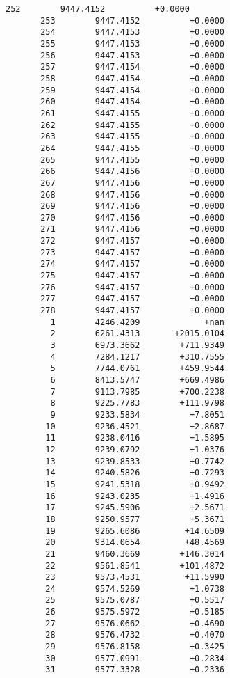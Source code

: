 \documentclass[11pt]{article}
\begin{document}
\begin{Verbatim}[commandchars=\\\{\}]
       252        9447.4152          +0.0000
       253        9447.4152          +0.0000
       254        9447.4153          +0.0000
       255        9447.4153          +0.0000
       256        9447.4153          +0.0000
       257        9447.4154          +0.0000
       258        9447.4154          +0.0000
       259        9447.4154          +0.0000
       260        9447.4154          +0.0000
       261        9447.4155          +0.0000
       262        9447.4155          +0.0000
       263        9447.4155          +0.0000
       264        9447.4155          +0.0000
       265        9447.4155          +0.0000
       266        9447.4156          +0.0000
       267        9447.4156          +0.0000
       268        9447.4156          +0.0000
       269        9447.4156          +0.0000
       270        9447.4156          +0.0000
       271        9447.4156          +0.0000
       272        9447.4157          +0.0000
       273        9447.4157          +0.0000
       274        9447.4157          +0.0000
       275        9447.4157          +0.0000
       276        9447.4157          +0.0000
       277        9447.4157          +0.0000
       278        9447.4157          +0.0000
         1        4246.4209             +nan
         2        6261.4313       +2015.0104
         3        6973.3662        +711.9349
         4        7284.1217        +310.7555
         5        7744.0761        +459.9544
         6        8413.5747        +669.4986
         7        9113.7985        +700.2238
         8        9225.7783        +111.9798
         9        9233.5834          +7.8051
        10        9236.4521          +2.8687
        11        9238.0416          +1.5895
        12        9239.0792          +1.0376
        13        9239.8533          +0.7742
        14        9240.5826          +0.7293
        15        9241.5318          +0.9492
        16        9243.0235          +1.4916
        17        9245.5906          +2.5671
        18        9250.9577          +5.3671
        19        9265.6086         +14.6509
        20        9314.0654         +48.4569
        21        9460.3669        +146.3014
        22        9561.8541        +101.4872
        23        9573.4531         +11.5990
        24        9574.5269          +1.0738
        25        9575.0787          +0.5517
        26        9575.5972          +0.5185
        27        9576.0662          +0.4690
        28        9576.4732          +0.4070
        29        9576.8158          +0.3425
        30        9577.0991          +0.2834
        31        9577.3328          +0.2336

\end{Verbatim}
\end{document}
